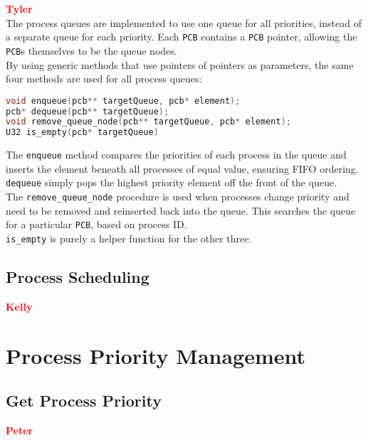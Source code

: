 \documentclass[12pt]{report}
\begin{document}
\textcolor{red}{\textbf{Tyler}} \\
The process queues are implemented to use one queue for all priorities, instead of a separate queue for each priority. Each {\tt PCB} contains a {\tt PCB} pointer, allowing the {\tt PCB}s themselves to be the queue nodes. \\
By using generic methods that use pointers of pointers as parameters, the same four methods are used for all process queues: \\
\begin{minipage}{\textwidth}
\begin{lstlisting}[language=C, frame=single]
void enqueue(pcb** targetQueue, pcb* element);
pcb* dequeue(pcb** targetQueue);
void remove_queue_node(pcb** targetQueue, pcb* element);
U32 is_empty(pcb* targetQueue)
\end{lstlisting}
\end{minipage}
The {\tt enqueue} method compares the priorities of each process in the queue and inserts the element beneath all processes of equal value, ensuring FIFO ordering.\\
{\tt dequeue} simply pops the highest priority element off the front of the queue.\\
The {\tt remove_queue_node} procedure is used when processes change priority and need to be removed and reinserted back into the queue. This searches the queue for a particular {\tt PCB}, based on process ID.\\
{\tt is_empty} is purely a helper function for the other three.\\

\subsection{Process Scheduling}


\textcolor{red}{\textbf{Kelly}} \\



\section{Process Priority Management}

\subsection{Get Process Priority}

\textcolor{red}{\textbf{Peter}} \\
\end{document}
